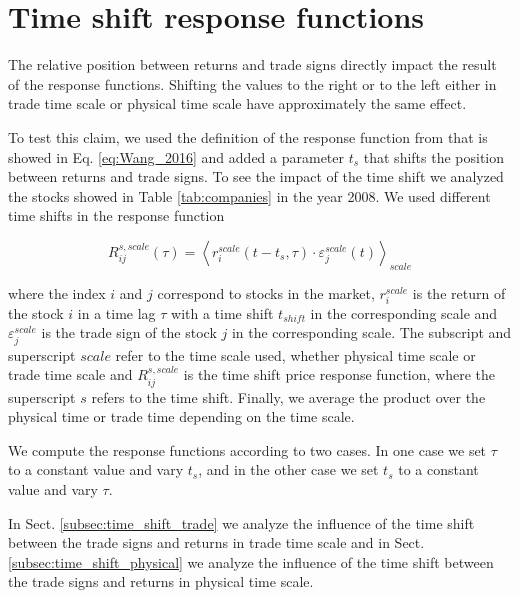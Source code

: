 \section{Time shift response functions}\label{sec:time_shift}

The relative position between returns and trade signs directly impact the
result of the response functions. Shifting the values to the right or to the
left either in trade time scale or physical time scale have approximately the
same effect.

To test this claim, we used the definition of the response function from
\cite{Wang_2016_cross} that is showed in Eq. \ref{eq:Wang_2016} and added
a parameter $t_{s}$ that shifts the position between returns and trade signs.
To see the impact of the time shift we analyzed the stocks showed in Table
\ref{tab:companies} in the year 2008. We used different time shifts in the
response function

\begin{equation}\label{eq:time_shift_general}
    R_{ij}^{s, scale}\left(\tau\right)=\left\langle r^{scale}_{i}
    \left(t-t_{s},\tau\right) \cdot\varepsilon^{scale}_{j}
    \left(t\right)\right\rangle _{scale}
\end{equation}

where the index $i$ and $j$ correspond to stocks in the market, $r^{scale}_{i}$
is the return of the stock $i$ in a time lag $\tau$ with a time shift
$t_{shift}$ in the corresponding scale and $\varepsilon^{scale}_{j}$ is the
trade sign of the stock $j$ in the corresponding scale. The subscript and
superscript $scale$ refer to the time scale used, whether physical time scale
or trade time scale and $R_{ij}^{s,scale}$ is the time shift price response
function, where the superscript $s$ refers to the time shift. Finally, we
average the product over the physical time or trade time depending on the time
scale.

We compute the response functions according to two cases. In one case we set
$\tau$ to a constant value and vary $t_{s}$, and in the other case we set
$t_{s}$ to a constant value and vary $\tau$.

In Sect. \ref{subsec:time_shift_trade} we analyze the influence of the time
shift between the trade signs and returns in trade time scale and in Sect.
\ref{subsec:time_shift_physical} we analyze the influence of the time shift
between the trade signs and returns in physical time scale.

